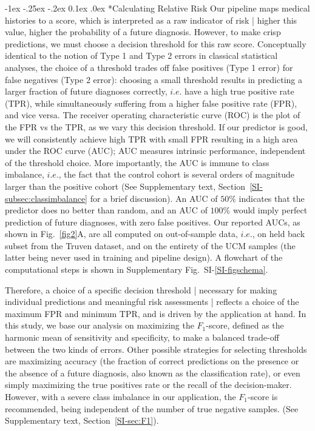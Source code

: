 \documentclass[onecolumn,,10pt]{IEEEtran}
\makeatletter
\renewcommand\subsection{\@startsection {section}{1}{\z@}%
  {-1ex \@plus -.25ex \@minus -.2ex}%
  {0.1ex \@plus.0ex}%
  {\fontsize{11}{12}\selectfont\bfseries\sffamily\color{DodgerBlue4}}}
\def\treatment{positive\xspace}
\makeatother
\begin{document}
\subsection*{Calculating Relative Risk}
Our pipeline maps medical histories to a  score, which is interpreted as a raw indicator of 
risk | higher this value, higher the probability of a future diagnosis. However, to make crisp predictions, we must choose  a decision threshold for this raw score. Conceptually identical to the notion of Type 1 and Type 2 errors in classical statistical analyses, the choice of a threshold trades off false positives (Type 1 error) for false negatives (Type 2 error): choosing a small threshold  results in predicting a larger fraction of future diagnoses correctly, $i.e.$ have a high true positive rate (TPR), while simultaneously suffering from a higher false positive rate (FPR), and vice versa. The receiver operating characteristic curve (ROC) is the plot of the  FPR vs the TPR, as we vary this decision threshold. If our predictor is good, we will consistently achieve high TPR with small FPR resulting in a high area under the ROC curve (AUC); AUC measures  intrinsic performance, independent of the threshold choice. More importantly, the AUC is  immune to class imbalance, $i.e.$, the fact that the control cohort is several orders of magnitude larger than the \treatment cohort (See Supplementary text, Section~\ref{SI-subsec:classimbalance} for a brief discussion). An AUC of $50\%$ indicates that the predictor does no better  than random, and an AUC of $100\%$ would imply perfect prediction of future diagnoses, with zero false positives. Our reported AUCs, as shown in Fig.~\ref{fig2}A, are all computed on out-of-sample data, $i.e.$, on held back subset from the Truven dataset, and on the entirety of the UCM samples (the latter being never used in training and pipeline design).
A flowchart of the computational steps is shown in Supplementary Fig.~SI-\ref{SI-figschema}.



Therefore, a choice of a specific decision threshold | necessary for making individual predictions and meaningful risk assessments |  reflects a choice of the maximum FPR and minimum TPR, and is   driven by the application at hand. In this study, we base our analysis on maximizing the $F_1$-score, defined as the harmonic mean of sensitivity and specificity, to make a   balanced trade-off between the two kinds of errors. Other possible strategies for selecting thresholds  are maximizing accuracy (the fraction of correct predictions on the presence or the absence of a future diagnosis, also known as the classification rate), or even simply maximizing the true positives rate or the recall of the decision-maker. However, with a severe class imbalance in our application, the $F_1$-score is recommended, being independent of the number of true negative samples. (See Supplementary text, Section~\ref{SI-sec:F1}).
\end{document}
